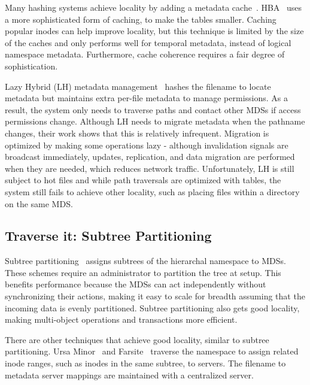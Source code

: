 Many hashing systems achieve locality by adding a metadata cache~\cite{li:msst2006-dynamic, xing:sc2009-skyfs}. HBA~\cite{zhu:pds2008-hba} uses a more sophisticated form of caching, to make the tables smaller. Caching popular inodes can help improve locality, but this technique is limited by the size of the caches and only performs well for temporal metadata, instead of logical namespace metadata. Furthermore, cache coherence requires a fair degree of sophistication.

Lazy Hybrid (LH) metadata management~\cite{brandt:mss2003-lh} hashes the filename to locate metadata but maintains extra per-file metadata to manage permissions. As a result, the system only needs to traverse paths and contact other MDSs if access permissions change. Although LH needs to migrate metadata when the pathname changes, their work shows that this is relatively infrequent. Migration is optimized by making some operations lazy - although invalidation signals are broadcast immediately, updates, replication, and data migration are performed when they are needed, which reduces network traffic. Unfortunately, LH is still subject to hot files and while path traversals are optimized with tables, the system still fails to achieve other  locality, such as placing files within a directory on the same MDS. 
 

\subsection{Traverse it: Subtree Partitioning}
Subtree partitioning~\cite{website:lustre,welch:fast2008-panasas} assigns subtrees of the hierarchal namespace to MDSs. These schemes require an administrator to partition the tree at setup. This benefits performance because the MDSs can act independently without synchronizing their actions, making it easy to scale for breadth assuming that the incoming data is evenly partitioned. Subtree partitioning also gets good locality, making multi-object operations and transactions more efficient. 

There are other techniques that achieve good locality, similar to subtree partitioning. Ursa Minor~\cite{sinnamohideen:atc2010-ursa} and Farsite~\cite{doucer:osdi2006-farsite-dir} traverse the namespace to assign related inode ranges, such as inodes in the same subtree, to servers. The filename to metadata server mappings are maintained with a centralized server.

